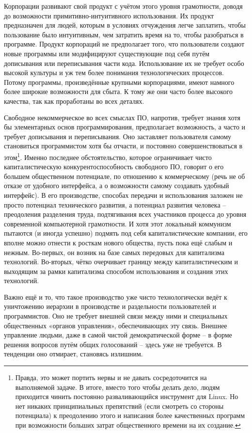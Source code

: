 \documentclass[12pt,a4paper,openany]{book}
\begin{document}
Корпорации развивают свой продукт с учётом этого уровня грамотности, доводя до возможности примитивно-интуитивного использования. Их продукт предназначен для людей, которым в условиях отчуждения легче заплатить, чтобы пользование было интуитивным, чем затратить время на то, чтобы разобраться в программе. Продукт корпораций не предполагает того, что пользователи создают новые программы или модифицируют существующие под себя путём дописывания или переписывания части кода. Использование их не требует особо высокой культуры и уж тем более понимания технологических процессов. Потому программы, произведённые крупными корпорациями, имеют намного более широкие возможности для сбыта. К тому же они часто более высокого качества, так как проработаны во всех деталях.

Свободное некоммерческое во всех смыслах ПО, напротив, требует знания хотя бы элементарных основ программирования, предполагает возможность, а часто и требует дописывания и переписывания. Оно заставляет пользователя самому становиться программистом хотя бы отчасти, и постоянно совершенствоваться в этом\footnote{Правда, это может портить нервы и не давать сосредоточится на выполняемой задаче. В итоге, вместо того чтобы делать дело, людям приходится чинить постоянно разваливающийся инструмент для Linux. Но нет никаких принципиальных препятствий (если смотреть со стороны потенциала) к преодолению этого и написания более качественных программ при возможности больших затрат общественного времени на их создание.}. Именно последнее обстоятельство, которое ограничивает чисто капиталистическую конкурентоспособность свободного ПО, говорит о его большем общественном потенциале, по отношению к коммерческому (речь не об отказе от удобного интерфейса, а о возможности самому создавать удобный интерфейс). В его производстве, способах передачи и использования заложен не просто потенциал технического развития, а потенциал развития человека – преодоления разделения труда, подтягивания всех участников процесса до уровня современной компьютерной грамотности. И хотя этот локальный коммунизм пытаются (и иногда успешно) подмять под себя капиталистические компании, его вполне можно отнести к росткам нового общества, пусть пока ещё слабым и нежным. Во-первых, он возник на базе самых передовых для капитализма технологий. Во-вторых, чётко очерчивает границу между капиталистическим и выходящим за рамки капитализма способом использования и создания этих технологий.

Важно ещё и то, что такое производство уже чисто технологически ведёт к уничтожению иерархии в производстве и раздельности пользователей и программистов. Оно не требует внешней связи между ними и специальных общественных «органов управления», обеспечивающих эту связь. Внешнее управление людьми, даже в самой чистой демократической форме – в форме решения вопросов путём общих голосований – здесь уже не требуется. В тенденции оно отмирает, становясь излишним.
\end{document}
